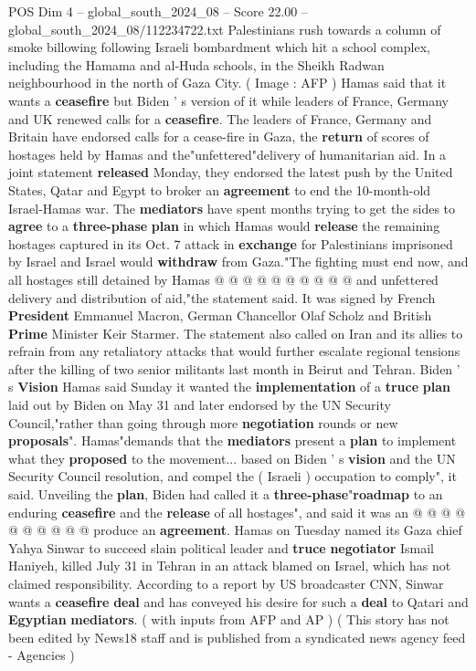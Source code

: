 \begin{textsample}{POS Dim 4 – global\_south\_2024\_08 – Score 22.00 – global\_south\_2024\_08/112234722.txt}  \label{ex:f4_pos_129}
Palestinians rush towards a column of smoke billowing following Israeli bombardment which hit a school complex, including the Hamama and al-Huda schools, in the Sheikh Radwan neighbourhood in the north of Gaza City. ( Image : AFP ) Hamas said that it wants a \textbf{ceasefire} but Biden ' s version of it while leaders of France, Germany and UK renewed calls for a \textbf{ceasefire}.
The leaders of France, Germany and Britain have endorsed calls for a cease-fire in Gaza, the \textbf{return} of scores of hostages held by Hamas and the"unfettered"delivery of humanitarian aid.
In a joint statement \textbf{released} Monday, they endorsed the latest push by the United States, Qatar and Egypt to broker an \textbf{agreement} to end the 10-month-old Israel-Hamas war.
The \textbf{mediators} have spent months trying to get the sides to \textbf{agree} to a \textbf{three-phase} \textbf{plan} in which Hamas would \textbf{release} the remaining hostages captured in its Oct. 7 attack in \textbf{exchange} for Palestinians imprisoned by Israel and Israel would \textbf{withdraw} from Gaza."The fighting must end now, and all hostages still detained by Hamas @ @ @ @ @ @ @ @ @ @ and unfettered delivery and distribution of aid,"the statement said.
It was signed by French \textbf{President} Emmanuel Macron, German Chancellor Olaf Scholz and British \textbf{Prime} Minister Keir Starmer.
The statement also called on Iran and its allies to refrain from any retaliatory attacks that would further escalate regional tensions after the killing of two senior militants last month in Beirut and Tehran.
Biden ' s \textbf{Vision} Hamas said Sunday it wanted the \textbf{implementation} of a \textbf{truce} \textbf{plan} laid out by Biden on May 31 and later endorsed by the UN Security Council,"rather than going through more \textbf{negotiation} rounds or new \textbf{proposals}".
Hamas"demands that the \textbf{mediators} present a \textbf{plan} to implement what they \textbf{proposed} to the movement... based on Biden ' s \textbf{vision} and the UN Security Council resolution, and compel the ( Israeli ) occupation to comply", it said.
Unveiling the \textbf{plan}, Biden had called it a \textbf{three-phase}"\textbf{roadmap} to an enduring \textbf{ceasefire} and the \textbf{release} of all hostages", and said it was an @ @ @ @ @ @ @ @ @ @ produce an \textbf{agreement}.
Hamas on Tuesday named its Gaza chief Yahya Sinwar to succeed slain political leader and \textbf{truce} \textbf{negotiator} Ismail Haniyeh, killed July 31 in Tehran in an attack blamed on Israel, which has not claimed responsibility.
According to a report by US broadcaster CNN, Sinwar wants a \textbf{ceasefire} \textbf{deal} and has conveyed his desire for such a \textbf{deal} to Qatari and \textbf{Egyptian} \textbf{mediators}. ( with inputs from AFP and AP ) ( This story has not been edited by News18 staff and is published from a syndicated news agency feed - Agencies )

\end{textsample}
